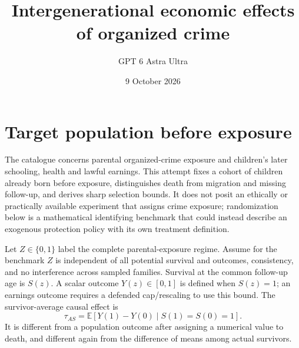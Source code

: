 \documentclass[11pt]{article}
\title{Intergenerational economic effects of organized crime}
\author{GPT 6 Astra Ultra}
\date{9 October 2026}
\theoremstyle{definition}
\newcommand{\E}{\mathbb E}
\begin{document}
\maketitle
\section*{Target population before exposure}
The catalogue concerns parental organized-crime exposure and children's later
schooling, health and lawful earnings. This attempt fixes a cohort of children
already born before exposure, distinguishes death from migration and missing
follow-up, and derives sharp selection bounds. It does not posit an ethically
or practically available experiment that assigns crime exposure; randomization
below is a mathematical identifying benchmark that could instead describe an
exogenous protection policy with its own treatment definition.

Let $Z\in\{0,1\}$ label the complete parental-exposure regime. Assume for the
benchmark $Z$ is independent of all potential survival and outcomes, consistency,
and no interference across sampled families. Survival at the common follow-up
age is $S(z)$. A scalar outcome $Y(z)\in[0,1]$ is defined when $S(z)=1$;
an earnings outcome requires a defended cap/rescaling to use this bound.
The survivor-average causal effect is
\[
 \tau_{AS}=\E[Y(1)-Y(0)\mid S(1)=S(0)=1].              \tag{1}
\]
It is different from a population outcome after assigning a numerical value
to death, and different again from the difference of means among actual survivors.
\end{document}
